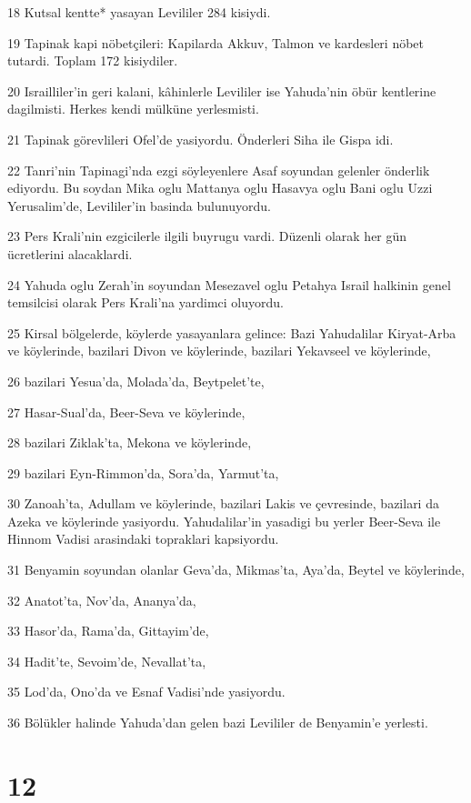 \par 18 Kutsal kentte* yasayan Levililer 284 kisiydi.
\par 19 Tapinak kapi nöbetçileri: Kapilarda Akkuv, Talmon ve kardesleri nöbet tutardi. Toplam 172 kisiydiler.
\par 20 Israilliler'in geri kalani, kâhinlerle Levililer ise Yahuda'nin öbür kentlerine dagilmisti. Herkes kendi mülküne yerlesmisti.
\par 21 Tapinak görevlileri Ofel'de yasiyordu. Önderleri Siha ile Gispa idi.
\par 22 Tanri'nin Tapinagi'nda ezgi söyleyenlere Asaf soyundan gelenler önderlik ediyordu. Bu soydan Mika oglu Mattanya oglu Hasavya oglu Bani oglu Uzzi Yerusalim'de, Levililer'in basinda bulunuyordu.
\par 23 Pers Krali'nin ezgicilerle ilgili buyrugu vardi. Düzenli olarak her gün ücretlerini alacaklardi.
\par 24 Yahuda oglu Zerah'in soyundan Mesezavel oglu Petahya Israil halkinin genel temsilcisi olarak Pers Krali'na yardimci oluyordu.
\par 25 Kirsal bölgelerde, köylerde yasayanlara gelince: Bazi Yahudalilar Kiryat-Arba ve köylerinde, bazilari Divon ve köylerinde, bazilari Yekavseel ve köylerinde,
\par 26 bazilari Yesua'da, Molada'da, Beytpelet'te,
\par 27 Hasar-Sual'da, Beer-Seva ve köylerinde,
\par 28 bazilari Ziklak'ta, Mekona ve köylerinde,
\par 29 bazilari Eyn-Rimmon'da, Sora'da, Yarmut'ta,
\par 30 Zanoah'ta, Adullam ve köylerinde, bazilari Lakis ve çevresinde, bazilari da Azeka ve köylerinde yasiyordu. Yahudalilar'in yasadigi bu yerler Beer-Seva ile Hinnom Vadisi arasindaki topraklari kapsiyordu.
\par 31 Benyamin soyundan olanlar Geva'da, Mikmas'ta, Aya'da, Beytel ve köylerinde,
\par 32 Anatot'ta, Nov'da, Ananya'da,
\par 33 Hasor'da, Rama'da, Gittayim'de,
\par 34 Hadit'te, Sevoim'de, Nevallat'ta,
\par 35 Lod'da, Ono'da ve Esnaf Vadisi'nde yasiyordu.
\par 36 Bölükler halinde Yahuda'dan gelen bazi Levililer de Benyamin'e yerlesti.

\chapter{12}

